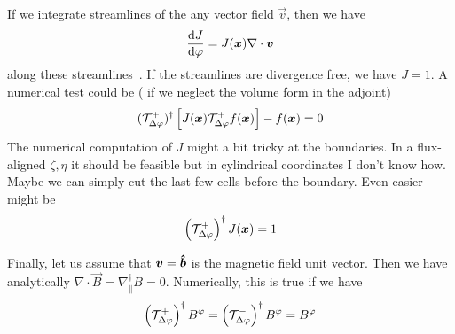 If we integrate streamlines of the any vector field $\vec v$, then we have
\begin{align}
    \frac{\mathrm{d} J}{\mathrm{d} \varphi} = J({\boldsymbol{x}} ) \nabla\cdot{\boldsymbol{v}}
    \label{}
\end{align}
along these streamlines~\cite{something}.
If the streamlines are divergence free, we have $J=1$.
A numerical test could be ( if we neglect the volume form in the adjoint)
\begin{align}
    (\mathcal T^+_{\Delta\varphi})^\dagger \left[J({\boldsymbol{x}})\mathcal T^+_{\Delta\varphi} f({\boldsymbol{x}})\right] - f({\boldsymbol{x}}) = 0
    \label{}
\end{align}
The numerical computation of $J$ might a bit tricky at the boundaries.
In a flux-aligned $\zeta, \eta$ it should be feasible but in cylindrical coordinates I don't know how. Maybe we can simply cut the last few cells before the boundary.
Even easier might be
\begin{align}
    \left(\mathcal T^+_{\Delta\varphi}\right)^\dagger J({\boldsymbol{x}} ) = 1
    \label{}
\end{align}

Finally, let us assume that ${\boldsymbol{v}} = \bm{\hat{b}}$ is the magnetic field
unit vector. Then we have analytically $\nabla\cdot \vec B= \nabla_\parallel^\dagger B = 0$.
Numerically, this is true if we have
\begin{align}
\left(\mathcal T^+_{\Delta\varphi}\right)^\dagger B^\varphi  = \left(\mathcal T^-_{\Delta\varphi}\right)^\dagger B^\varphi = B^\varphi
\end{align}

